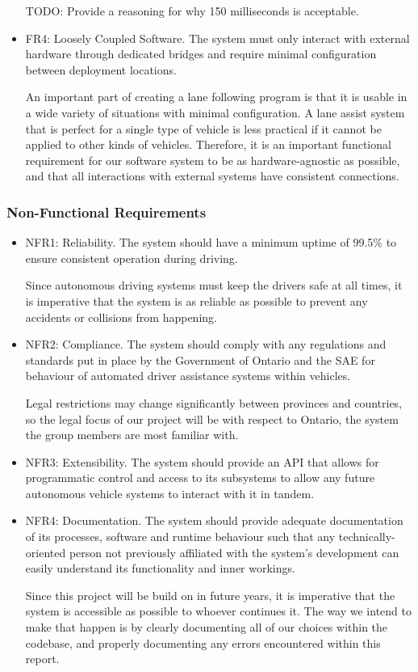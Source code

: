 \documentclass[titlepage]{article}
\begin{document}
\begin{itemize}
	      TODO: Provide a reasoning for why 150 milliseconds is acceptable.


	\item FR4: Loosely Coupled Software. The system must only interact with external hardware through dedicated bridges and require minimal configuration between deployment locations.

	      An important part of creating a lane following program is that it is usable in a wide variety of situations with minimal configuration. A lane assist system that is perfect for a single type of vehicle is less practical if it cannot be applied to other kinds of vehicles. Therefore, it is an important functional requirement for our software system to be as hardware-agnostic as possible, and that all interactions with external systems have consistent connections.

\end{itemize}

\subsubsection{Non-Functional Requirements}
\begin{itemize}
	\item NFR1: Reliability.
	      The system should have a minimum uptime of 99.5\% to ensure consistent operation during driving.

	      Since autonomous driving systems must keep the drivers safe at all times, it is imperative that the system is as reliable as possible to prevent any accidents or collisions from happening.

	\item NFR2: Compliance.
	      The system should comply with any regulations and standards put in place by the Government of Ontario and the SAE for behaviour of automated driver assistance systems within vehicles.

	      Legal restrictions may change significantly between provinces and countries, so the legal focus of our project will be with respect to Ontario, the system the group members are most familiar with.

	\item NFR3: Extensibility. The system should provide an API that allows for programmatic control and access to its subsystems to allow any future autonomous vehicle systems to interact with it in tandem.

	\item NFR4: Documentation.
	      The system should provide adequate documentation of its processes, software and runtime behaviour such that any technically-oriented person not previously affiliated with the system’s development can easily understand its functionality and inner workings.

	      Since this project will be build on in future years, it is imperative that the system is accessible as possible to whoever continues it. The way we intend to make that happen is by clearly documenting all of our choices within the codebase, and properly documenting any errors encountered within this report.

\end{itemize}
\end{document}
